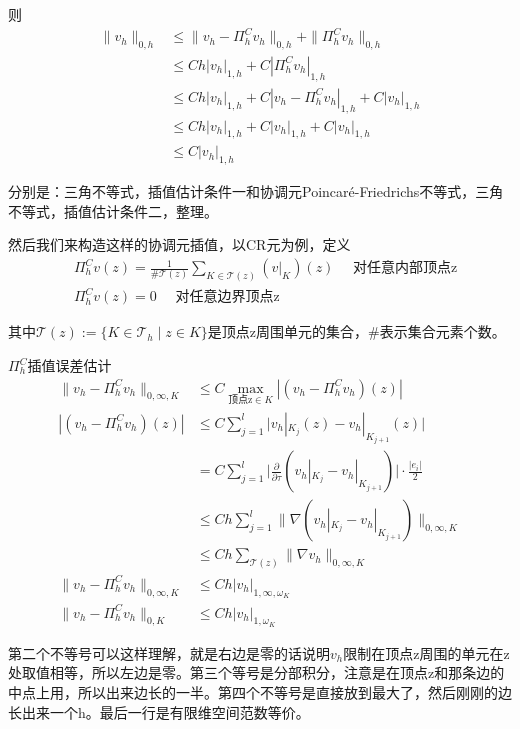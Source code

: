 则
\[
  \begin{aligned}
    \|v_{h}\|_{0, h} &\le \|v_h - \Pi_{h}^{C} v_h\|_{0, h} + \|\Pi_{h}^{C} v_h\|_{0, h}\\
    &\le Ch |v_h|_{1, h} + C|\Pi_{h}^{C} v_h|_{1, h}\\
    &\le Ch |v_h|_{1, h} + C|v_h - \Pi_{h}^{C} v_h|_{1, h} + C|v_h|_{1, h}\\
    &\le Ch |v_h|_{1, h} + C|v_h|_{1, h} + C|v_h|_{1, h}\\
    &\le C |v_h|_{1, h}
  \end{aligned}
\]

分别是：三角不等式，插值估计条件一和协调元Poincaré-Friedrichs不等式，三角不等式，插值估计条件二，整理。

然后我们来构造这样的协调元插值，以CR元为例，定义
\[
  \begin{aligned}
    &\Pi_{h}^{C} v(z)=\frac{1}{\# \mathcal{T}(z)} \sum_{K \in \mathcal{T}(z)}\left(\left.v\right|_{K}\right)(z) \quad \text{ 对任意内部顶点z}\\
    &\Pi_{h}^{C} v(z)=0 \quad \text{ 对任意边界顶点z} 
  \end{aligned}
\]

其中$\mathcal{T}(z):=\{K \in \mathcal{T}_h \mid z \in K\}$是顶点z周围单元的集合，\#表示集合元素个数。

$\Pi_{h}^{C}$插值误差估计
\[
  \begin{aligned}
    \|v_h - \Pi_{h}^{C} v_h\|_{0, \infty, K} &\le C \max_{\text{顶点z} \in K} |(v_h - \Pi_{h}^{C} v_h)(z)|\\
    |(v_h - \Pi_{h}^{C} v_h)(z)| &\le C \sum_{j = 1}^l \big|v_h|_{K_j}(z) - v_h|_{K_{j + 1}}(z)\big|\\
    &= C \sum_{j = 1}^l \bigg| \frac{\partial}{\partial \tau} (v_h|_{K_j} - v_h|_{K_{j + 1}})\bigg| \cdot \frac{|e_i|}{2}\\
    &\le Ch \sum_{j = 1}^l \| \nabla (v_h|_{K_j} - v_h|_{K_{j + 1}})\|_{0, \infty, K}\\
    &\le Ch \sum_{\mathcal{T}(z)} \|\nabla v_h\|_{0, \infty, K}\\
    \|v_h - \Pi_{h}^{C} v_h\|_{0, \infty, K} &\le Ch |v_h|_{1, \infty, \omega_K}\\
    \|v_h - \Pi_{h}^{C} v_h\|_{0, K} &\le Ch |v_h|_{1, \omega_K}
  \end{aligned}
\]

第二个不等号可以这样理解，就是右边是零的话说明$v_h$限制在顶点z周围的单元在z处取值相等，所以左边是零。第三个等号是分部积分，注意是在顶点z和那条边的中点上用，所以出来边长的一半。第四个不等号是直接放到最大了，然后刚刚的边长出来一个h。最后一行是有限维空间范数等价。

